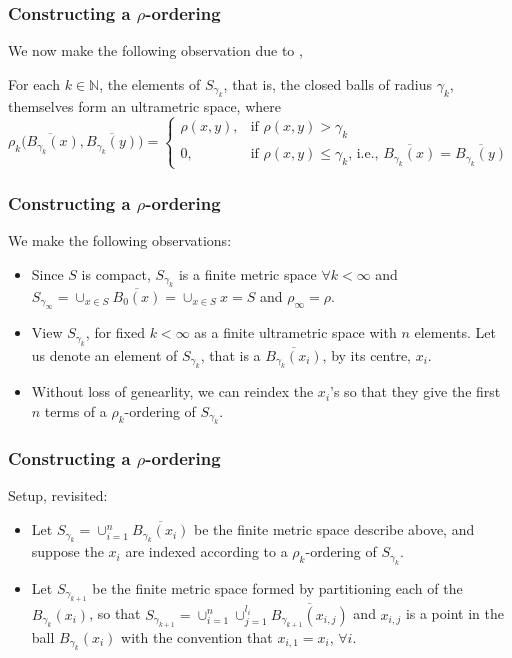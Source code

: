 \documentclass{beamer}
\theoremstyle{definition}
\begin{document}
\begin{frame}
\frametitle{Constructing a $\rho$-ordering}
We now make the following observation due to \cite{na},

\begin{lemma}
For each $k \in \mathbb{N}$, the elements of $S_{\gamma_k}$, that is, the closed balls of radius $\gamma_k$, themselves form an ultrametric space, where 
\[ \rho_k\overline{(B_{\gamma_k}(x)},\overline{B_{\gamma_k}(y)}) = 
\begin{cases}
\rho(x,y), & \text{if } \rho(x,y) > \gamma_k \\
0, & \text{if }   \rho(x,y) \leq \gamma_k \text{, i.e., } \overline{B_{\gamma_k}(x)}=\overline{B_{\gamma_k}(y)}
\end{cases}
\]
\end{lemma}
\end{frame}

\begin{frame}
\frametitle{Constructing a $\rho$-ordering}
We make the following observations:
\begin{itemize}
\item Since $S$ is  compact,  $S_{\gamma_k}$ is a finite metric space $\forall k < \infty$ and $S_{\gamma_\infty}=\cup_{x \in S}\overline{B_0(x)} = \cup_{x \in S}x=S$ and $\rho_\infty=\rho$. 
\item View $S_{\gamma_k}$, for fixed $k < \infty$ as a finite ultrametric space with $n$ elements. Let us denote an element of  $S_{\gamma_k}$, that is a $\overline{B_{\gamma_k}(x_i)}$, by its centre, $x_i$. 
\item Without loss of genearlity, we can reindex the $x_i$'s so that they give the first $n$ terms of a $\rho_k$-ordering of $S_{\gamma_k}$.
\end{itemize}
\end{frame}	


\begin{frame}
\frametitle{Constructing a $\rho$-ordering}
Setup, revisited:
\begin{itemize}
\item Let $S_{\gamma_k} =  \cup_{i=1}^n \overline{B_{\gamma_k}(x_i)}$ be the finite metric space describe above, and suppose the $x_i$ are indexed according to a $\rho_k$-ordering of  $S_{\gamma_k}$.
\item Let  $S_{\gamma_{k+1}}$ be the finite metric space formed by partitioning each of the ${B_{\gamma_k}(x_i)}$, so that  $S_{\gamma_{k+1}} = \cup_{i=1}^n \cup_{j=1}^{l_i} \overline{B_{\gamma_{k+1}}(x_{i,j})}$ and $x_{i,j}$ is a point in the ball $B_{\gamma_k}(x_i)$ with the convention that $x_{i,1} = x_i$, $\forall i$. 
\end{itemize}
\end{frame}
\end{document}
